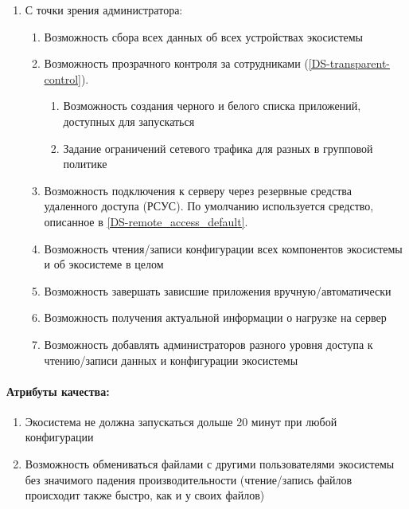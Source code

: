 \begin{enumerate}[label={\bfseries ПТ-\arabic*.}]
   \item С точки зрения администратора:
         \begin{enumerate}[label*={\bfseries\arabic*.}]
            \item Возможность сбора всех данных об всех устройствах экосистемы
            \item Возможность прозрачного контроля за сотрудниками (\ref{DS-transparent-control}).
                  \begin{enumerate}[label*={\bfseries\arabic*.}]
                     \item Возможность создания черного и белого списка приложений, доступных для запускаться
                     \item Задание ограничений сетевого трафика для разных в групповой политике
                  \end{enumerate}

            \item Возможность подключения к серверу через резервные средства удаленного доступа (РСУС). По умолчанию используется средство, описанное в \ref{DS-remote_access_default}.
            \item Возможность чтения/записи конфигурации всех компонентов экосистемы и об экосистеме в целом
            \item Возможность завершать зависшие приложения вручную/автоматически
            \item Возможность получения актуальной информации о нагрузке на сервер
            \item Возможность добавлять администраторов разного уровня доступа к чтению/записи данных и конфигурации экосистемы
         \end{enumerate}
\end{enumerate}

\paragraph*{Атрибуты качества:}
\begin{enumerate}[label={\bfseries АК-\arabic*.}]
   \item Экосистема не должна запускаться дольше 20 минут при любой конфигурации
   \item Возможность обмениваться файлами с другими пользователями экосистемы без значимого падения производительности (чтение/запись файлов происходит также быстро, как и у своих файлов)
\end{enumerate}

